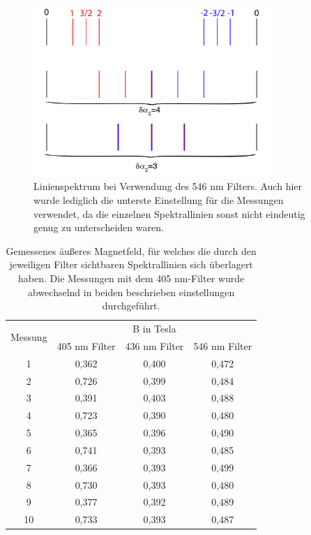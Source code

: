 \documentclass[bigchapter,colorback,accentcolor=tud4b,linedtoc,11pt]{tudreport}
\begin{document}
\begin{figure}[H] 
  \centering
     \includegraphics[width=0.8\textwidth]{img/linienspektrum546.png}
     \caption{Linienspektrum bei Verwendung des 546 nm Filters. Auch hier wurde
       lediglich die unterste Einstellung für die Messungen verwendet, da die
       einzelnen Spektrallinien sonst nicht eindeutig genug zu unterscheiden waren.}
  \label{fig:546nmlines}
\end{figure}


\begin{table}[H]
  \begin{center}
  \begin{tabular}{|c|c|c|c|}
    \hline
    \multirow{2}{*}{Messung} & \multicolumn{3}{c|}{B in Tesla}     \\ \cline{2-4}
                             & 405 nm Filter & 436 nm Filter & 546 nm Filter
                                                                   \\ \hline 
    1                        & 0,362        & 0,400        & 0,472 \\ \hline
    2                        & 0,726        & 0,399        & 0,484 \\ \hline
    3                        & 0,391        & 0,403        & 0,488 \\ \hline
    4                        & 0,723        & 0,390        & 0,480 \\ \hline
    5                        & 0,365        & 0,396        & 0,490 \\ \hline
    6                        & 0,741        & 0,393        & 0,485 \\ \hline
    7                        & 0,366        & 0,393        & 0,499 \\ \hline
    8                        & 0,730        & 0,393        & 0,480 \\ \hline
    9                        & 0,377        & 0,392        & 0,489 \\ \hline
    10                       & 0,733        & 0,393        & 0,487 \\ \hline
	\end{tabular}
    \caption{Gemessenes äußeres Magnetfeld, für welches die durch den jeweiligen
    Filter sichtbaren Spektrallinien sich überlagert haben. Die Messungen mit
    dem 405 nm-Filter wurde abwechselnd in beiden beschrieben einstellungen
    durchgeführt.}
  \end{center}
\end{table}
\end{document}
